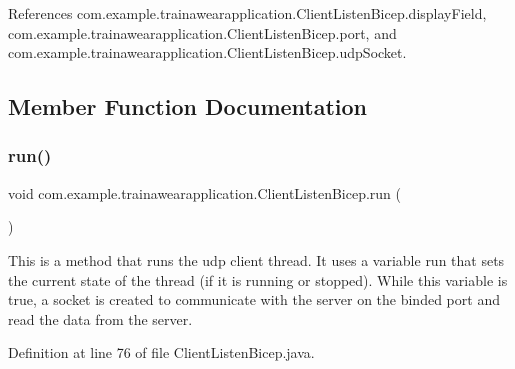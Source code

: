 References com.\+example.\+trainawearapplication.\+Client\+Listen\+Bicep.\+display\+Field, com.\+example.\+trainawearapplication.\+Client\+Listen\+Bicep.\+port, and com.\+example.\+trainawearapplication.\+Client\+Listen\+Bicep.\+udp\+Socket.



\subsection{Member Function Documentation}
\mbox{\label{classcom_1_1example_1_1trainawearapplication_1_1_client_listen_bicep_a00c62e73027050af19a527f480a9be15}} 
\subsubsection{\texorpdfstring{run()}{run()}}
{\footnotesize\ttfamily void com.\+example.\+trainawearapplication.\+Client\+Listen\+Bicep.\+run (\begin{DoxyParamCaption}{ }\end{DoxyParamCaption})}

This is a method that runs the udp client thread. It uses a variable run that sets the current state of the thread (if it is running or stopped). While this variable is true, a socket is created to communicate with the server on the binded port and read the data from the server.

Definition at line 76 of file Client\+Listen\+Bicep.\+java.


